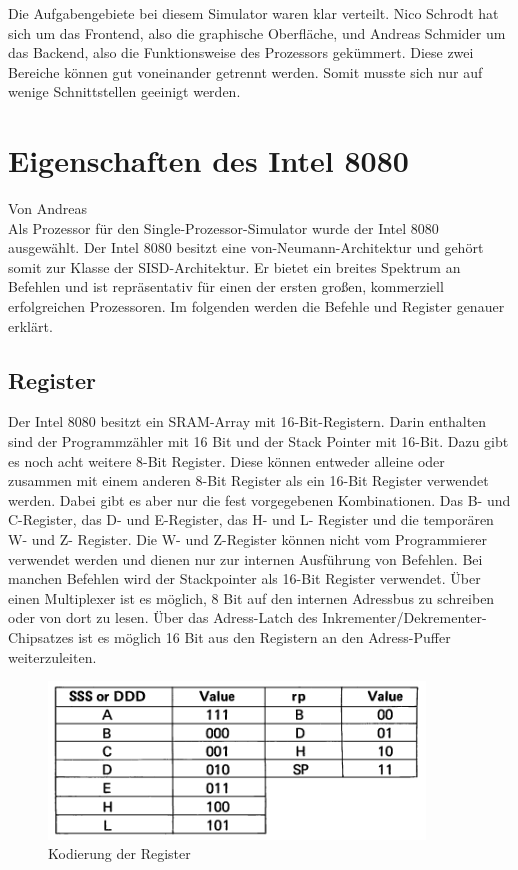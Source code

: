 \documentclass[12pt]{article}
\newcommand{\imgSpaceBefore}{\vspace{10pt}}
\begin{document}
\noindent
Die Aufgabengebiete bei diesem Simulator waren klar verteilt. Nico Schrodt hat sich um das Frontend, also die graphische Oberfläche, und Andreas Schmider um das Backend, also die Funktionsweise des Prozessors gekümmert. Diese zwei Bereiche können gut voneinander getrennt werden. Somit musste sich nur auf wenige Schnittstellen geeinigt werden.


\newpage

\section{Eigenschaften des Intel 8080}
\label{SPS} 
Von Andreas\\ 

\noindent
Als Prozessor für den Single-Prozessor-Simulator wurde der Intel 8080 ausgewählt. Der Intel 8080 besitzt eine von-Neumann-Architektur und gehört somit zur Klasse der SISD-Architektur. Er bietet ein breites Spektrum an Befehlen und ist repräsentativ für einen der ersten großen, kommerziell erfolgreichen Prozessoren. Im folgenden werden die Befehle und Register genauer erklärt.


\subsection{Register}
\label{RegisterSection}

Der Intel 8080 besitzt ein SRAM-Array mit 16-Bit-Registern. Darin enthalten sind der Programmzähler mit 16 Bit und der Stack Pointer mit 16-Bit. Dazu gibt es noch acht weitere 8-Bit Register. Diese können entweder alleine oder zusammen mit einem anderen 8-Bit Register als ein 16-Bit Register verwendet werden. Dabei gibt es aber nur die fest vorgegebenen Kombinationen. Das B- und C-Register, das D- und E-Register, das H- und L- Register und die temporären W- und Z- Register. Die W- und Z-Register können nicht vom Programmierer verwendet werden und dienen nur zur internen Ausführung von Befehlen. Bei manchen Befehlen wird der Stackpointer als 16-Bit Register verwendet.
Über einen Multiplexer ist es möglich, 8 Bit auf den internen Adressbus zu schreiben oder von dort zu lesen. Über das Adress-Latch des Inkrementer/Dekrementer-Chipsatzes ist es möglich 16 Bit aus den Registern an den Adress-Puffer weiterzuleiten. \cite{IntMan16}


\imgSpaceBefore
\begin{figure}[h]
\centering
\includegraphics[width=10cm]{Bilder/register_kodierung}
\caption{Kodierung der Register \cite{IntMan30}}
\label{fig:register_kodierung}
\end{figure}
\end{document}
